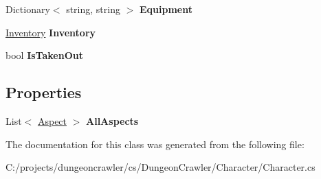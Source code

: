 \begin{DoxyCompactItemize}
\item 
\hypertarget{class_dungeon_crawler_1_1_character_1_1_character_a22cda9a13deb74dd0089970150354c9b}{}Dictionary$<$ string, string $>$ {\bfseries Equipment}\label{class_dungeon_crawler_1_1_character_1_1_character_a22cda9a13deb74dd0089970150354c9b}

\item 
\hypertarget{class_dungeon_crawler_1_1_character_1_1_character_a4a92503c577f806231fe03bafff227d2}{}\hyperlink{class_dungeon_crawler_1_1_character_1_1_inventory}{Inventory} {\bfseries Inventory}\label{class_dungeon_crawler_1_1_character_1_1_character_a4a92503c577f806231fe03bafff227d2}

\item 
\hypertarget{class_dungeon_crawler_1_1_character_1_1_character_aa9be269eb8ea184174ad9e27e06638e7}{}bool {\bfseries Is\+Taken\+Out}\label{class_dungeon_crawler_1_1_character_1_1_character_aa9be269eb8ea184174ad9e27e06638e7}

\end{DoxyCompactItemize}
\subsection*{Properties}
\begin{DoxyCompactItemize}
\item 
\hypertarget{class_dungeon_crawler_1_1_character_1_1_character_a970c74df860573bf88cfa26f6557142f}{}List$<$ \hyperlink{class_dungeon_crawler_1_1_core_1_1_aspect}{Aspect} $>$ {\bfseries All\+Aspects}\label{class_dungeon_crawler_1_1_character_1_1_character_a970c74df860573bf88cfa26f6557142f}

\end{DoxyCompactItemize}


The documentation for this class was generated from the following file\+:\begin{DoxyCompactItemize}
\item 
C\+:/projects/dungeoncrawler/cs/\+Dungeon\+Crawler/\+Character/Character.\+cs\end{DoxyCompactItemize}
